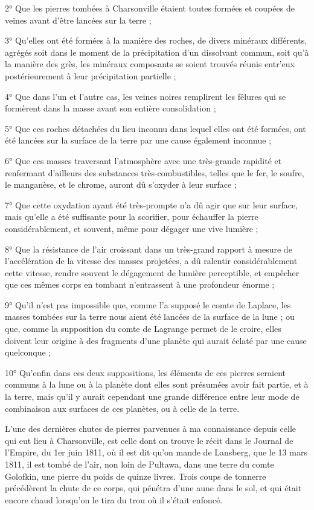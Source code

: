 \documentclass[a4paper, 12pt, oneside, french]{article}
\begin{document}
2° Que les pierres tombées à Charsonville étaient toutes formées et coupées de veines avant d'être lancées sur la terre ;

3° Qu'elles ont été formées à la manière des roches, de divers minéraux différents, agrégés soit dans le moment de la précipitation d'un dissolvant commun, soit qu'à la manière des grès, les minéraux composants se soient trouvés réunis entr'eux postérieurement à leur précipitation partielle ;

4° Que dans l'un et l'autre cas, les veines noires remplirent les fêlures qui se formèrent dans la masse avant son entière consolidation ;

5° Que ces roches détachées du lieu inconnu dans lequel elles ont été formées, ont été lancées sur la surface de la terre par une cause également inconnue ;

6° Que ces masses traversant l'atmosphère avec une très-grande rapidité et renfermant d'ailleurs des substances très-combustibles, telles que le fer, le soufre, le manganèse, et le chrome, auront dû s'oxyder à leur surface ;

7° Que cette oxydation ayant été très-prompte n'a dû agir que sur leur surface, mais qu'elle a été suffisante pour la scorifier, pour échauffer la pierre considérablement, et souvent, même pour dégager une vive lumière ;

8° Que la résistance de l'air croissant dans un très-grand rapport à mesure de l'accélération de la vitesse des masses projetées, a dû ralentir considérablement cette vitesse, rendre souvent le dégagement de lumière perceptible, et empêcher que ces mêmes corps en tombant n'entrassent à une profondeur énorme ;

9° Qu'il n'est pas impossible que, comme l'a supposé le comte de Laplace, les masses tombées sur la terre nous aient été lancées de la surface de la lune ; ou que, comme la supposition du comte de Lagrange permet de le croire, elles doivent leur origine à des fragments d'une planète qui aurait éclaté par une cause quelconque ;

10° Qu'enfin dans ces deux suppositions, les éléments de ces pierres seraient communs à la lune ou à la planète dont elles sont présumées avoir fait partie, et à la terre, mais qu'il y aurait cependant une grande différence entre leur mode de combinaison aux surfaces de ces planètes, ou à celle de la terre.

L'une des dernières chutes de pierres parvenues à ma connaissance depuis celle qui eut lieu à Charsonville, est celle dont on trouve le récit dans le Journal de l'Empire, du 1er juin 1811, où il est dit qu'on mande de Lansberg, que le 13 mars 1811, il est tombé de l'air, non loin de Pultawa, dans une terre du comte Golofkin, une pierre du poids de quinze livres. Trois coups de tonnerre précédèrent la chute de ce corps, qui pénétra d'une aune dans le sol, et qui était encore chaud lorsqu'on le tira du trou où il s'était enfoncé.
\end{document}
